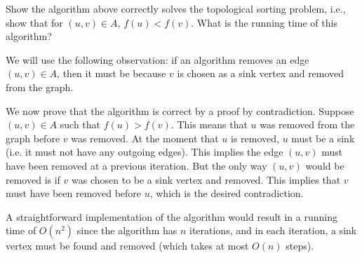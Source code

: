 \begin{flex}
\begin{exercise}
Show the algorithm above correctly solves the topological sorting problem, i.e., show that for $(u,v) \in A$, $f(u) < f(v)$. What is the running time of this algorithm?
\end{exercise}

\begin{solution}
We will use the following observation: if an algorithm removes an edge $(u,v) \in A$, then it must be because $v$ is chosen as a sink vertex and removed from the graph. 

We now prove that the algorithm is correct by a proof by contradiction. Suppose $(u,v) \in A$ such that $f(u) > f(v)$. This means that $u$ was removed from the graph before $v$ was removed. At the moment that $u$ is removed, $u$ must be a sink (i.e. it must not have any outgoing edges). This implies the edge $(u,v)$ must have been removed at a previous iteration. But the only way $(u,v)$ would be removed is if $v$ was chosen to be a sink vertex and removed. This implies that $v$ must have been removed before $u$, which is the desired contradiction.

A straightforward implementation of the algorithm would result in a running time of $O(n^2)$ since the algorithm has $n$ iterations, and in each iteration, a sink vertex must be found and removed (which takes at most $O(n)$ steps).
\end{solution}
\end{flex}


